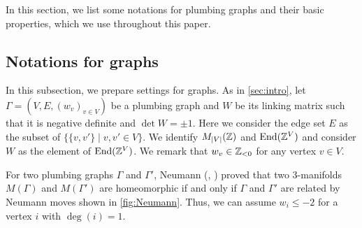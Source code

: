 \documentclass[11pt,a4paper,lualatex]{amsart}
\numberwithin{equation}{section} %
\begin{document}

In this section, we list some notations for plumbing graphs and their basic properties, which we use throughout this paper.


\subsection{Notations for graphs} \label{subsec:graph}


In this subsection, we prepare settings for graphs.
As in \cref{sec:intro}, let $ \Gamma = (V, E, (w_v)_{v \in V}) $ be a plumbing graph and $ W $ be its linking matrix such that it is negative definite and $ \det W = \pm 1 $.
Here we consider the edge set $ E $ as the subset of $ \{ \{ v, v' \} \mid v, v' \in V \} $.
We identify $ M_{\left\lvert V\right\rvert}(\mathbb{Z}) $ and $ \operatorname{End}(\mathbb{Z}^V) $ and consider $ W $ as the element of $ \operatorname{End}(\mathbb{Z}^V) $.
We remark that $ w_v \in \mathbb{Z}_{<0} $ for any vertex $ v \in V $.

For two plumbing graphs $ \Gamma $ and $ \Gamma' $, Neumann (\cite[Proposition 2.2]{Neumann_Lecture}, \cite[Theorem 3.1]{Neumann_work}) proved that two $ 3 $-manifolds $ M(\Gamma) $ and $ M(\Gamma') $ are homeomorphic if and only if $ \Gamma $ and $ \Gamma' $ are related by Neumann moves shown in \cref{fig:Neumann}.
Thus, we can assume $ w_i \le -2 $ for a vertex $ i $ with $ \deg(i) = 1 $. 
\end{document}
